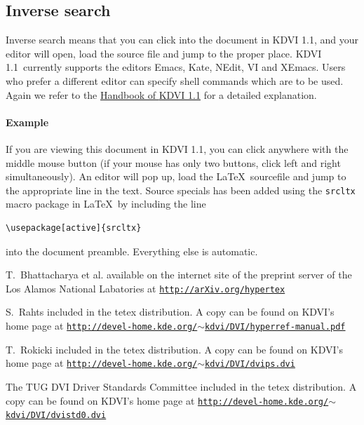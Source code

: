 \documentclass{article}
\newcommand{\KDVI}{{\sf KDVI 1.1}}
\begin{document}
\subsection{Inverse search}

Inverse search means that you can click into the document in \KDVI,
and your editor will open, load the source file and jump to the proper
place. \KDVI\ currently supports the editors Emacs, Kate, NEdit, VI
and XEmacs. Users who prefer a different editor can specify shell
commands which are to be used. Again we refer to the
\href{help:/kdvi/inverse-search.html}{Handbook of \KDVI} for a detailed explanation.

\paragraph*{Example}
If you are viewing this document in \KDVI, you can click anywhere with
the middle mouse button (if your mouse has only two buttons, click
left and right simultaneously). An editor will pop up, load the
\LaTeX\ sourcefile and jump to the appropriate line in the
text. Source specials has been added using the {\tt srcltx} macro
package in \LaTeX\ by including the line
\begin{verbatim}
\usepackage[active]{srcltx}
\end{verbatim}
into the document preamble. Everything else is automatic.


\begin{thebibliography}{CM97}

T.~Bhattacharya et al.
\newblock available on the internet site of the preprint server of the
 Los Alamos National Labatories at 
\href{http://arXiv.org/hypertex}{\small \tt http://arXiv.org/hypertex}

S.~Rahts
\newblock included in the tetex distribution. A copy can be found on KDVI's 
home page at \hfill \linebreak
\href{http://devel-home.kde.org/~kdvi/DVI/hyperref-manual.pdf}{\small \tt http://devel-home.kde.org/$\sim$kdvi/DVI/hyperref-manual.pdf}

T.~Rokicki
\newblock included in the tetex distribution. A copy can be found on KDVI's 
home page at \hfill \linebreak
\href{http://devel-home.kde.org/~kdvi/DVI/dvips.dvi}{\small \tt http://devel-home.kde.org/$\sim$kdvi/DVI/dvips.dvi}

The TUG DVI Driver Standards Committee
\newblock included in the tetex distribution. A copy can be found on KDVI's 
home page at \hfill \linebreak
\href{http://devel-home.kde.org/~kdvi/DVI/dvistd0.dvi}{\small \tt http://devel-home.kde.org/$\sim$kdvi/DVI/dvistd0.dvi}


\end{thebibliography}
\end{document}
